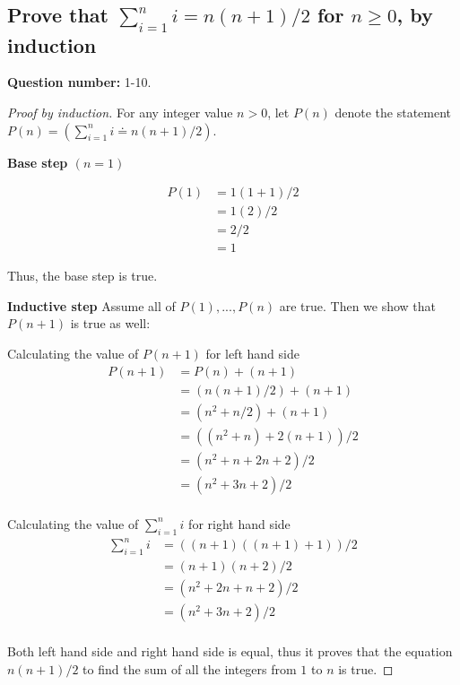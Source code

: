 \subsection{Prove that $\sum_{i=1}^{n} i = n(n+1)/2$ for $n \geq 0$, by induction}
  \textbf{Question number:} 1-10.

  \begin{proof}[Proof by induction]

    For any integer value $n > 0$, let $P(n)$ denote the statement $P(n) = (\sum_{i=1}^n i \doteq n(n+1)/2)$.

    \textbf{Base step $(n=1)$}

    \begin{align}
      P(1) &= 1(1+1)/2\\
           &= 1(2)/2\\
           &= 2/2\\
           &= 1
    \end{align}

    Thus, the base step is true.

    \textbf{Inductive step}
    Assume all of $P(1), ..., P(n)$ are true. Then we show that $P(n+1)$ is true as well:

    Calculating the value of $P(n+1)$ for left hand side
    \begin{align}
      P(n+1) &= P(n) + (n + 1)\\
             &= (n(n+1)/2) + (n+1)\\
             &= (n^2+n/2) + (n+1)\\
             &= ((n^2+n) + 2(n+1))/2\\
             &= (n^2+n + 2n+2)/2\\
             &= (n^2+3n+2)/2\\
    \end{align}

    Calculating the value of $\sum_{i=1}^n i$ for right hand side
    \begin{align}
      \sum_{i=1}^n i &= ((n+1)((n+1)+1))/2\\
                     &= (n+1)(n+2)/2\\
                     &= (n^2+2n+n+2)/2\\
                     &= (n^2+3n+2)/2\\
    \end{align}

    Both left hand side and right hand side is equal, thus it proves that the
    equation $n(n+1)/2$ to find the sum of all the integers from $1$ to $n$ is
    true.
    \qedhere
  \end{proof}
